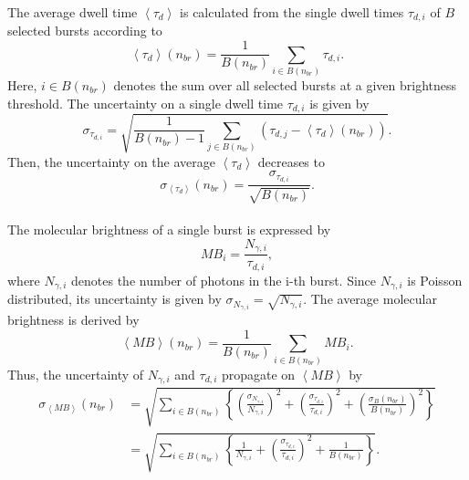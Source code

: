The average dwell time $\left\langle \tau_d \right\rangle$ is calculated from the single dwell times $\tau_{d,i}$ of $B$ selected bursts according to 
\begin{equation}
	\left\langle \tau_d \right\rangle (n_{br}) = \frac{1}{B(n_{br})} \sum_{i \in B(n_{br})} \tau_{d,i}. 
\end{equation}
Here, $i \in B(n_{br})$ denotes the sum over all selected bursts at a given brightness threshold. The uncertainty on a single dwell time $\tau_{d,i}$ is given by
\begin{equation}
	\sigma_{\tau_{d,i}} = \sqrt{\frac{1}{B(n_{br}) - 1} \sum_{j \in B(n_{br})} (\tau_{d,j} - \left\langle \tau_d \right\rangle (n_{br}))}.
\end{equation}
Then, the uncertainty on the average $\left\langle \tau_d \right\rangle$ decreases to 
\begin{equation}
	\sigma_{\left\langle \tau_d \right\rangle} (n_{br}) = \frac{\sigma_{\tau_{d,i}}}{\sqrt{B(n_{br})}}.
\end{equation}\\

The molecular brightness of a single burst is expressed by
\begin{equation}
	MB_i = \frac{N_{\gamma, i}}{\tau_{d, i}},
\end{equation}
where $N_{\gamma, i}$ denotes the number of photons in the i-th burst. Since $N_{\gamma, i}$ is Poisson distributed, its uncertainty is given by $\sigma_{N_{\gamma, i}} = \sqrt{N_{\gamma, i}}$. The average molecular brightness is derived by
\begin{equation}
	\left\langle MB \right\rangle (n_{br}) = \frac{1}{B(n_{br})} \sum_{i \in B(n_{br})} MB_i.
\end{equation}
Thus, the uncertainty of $N_{\gamma, i}$ and $\tau_{d, i}$ propagate on $\left\langle MB \right\rangle$ by
\begin{align}
	\sigma_{\left\langle MB \right\rangle} (n_{br}) &= \sqrt{\sum_{i \in B(n_{br})} \left \{ \left(\frac{\sigma_{N_{\gamma, i}}}{N_{\gamma,i}}\right)^2 + \left(\frac{\sigma_{\tau_{d, i}}}{\tau_{d, i}}\right)^2 + \left(\frac{\sigma_{B}(n_{br})}{B(n_{br})}\right)^2 \right \} }\\
	& = \sqrt{\sum_{i \in B(n_{br})} \left\{ \frac{1}{N_{\gamma,i}} + \left(\frac{\sigma_{\tau_{d, i}}}{\tau_{d, i}}\right)^2 + \frac{1}{B(n_{br})}\right\}}.
\end{align}\\

